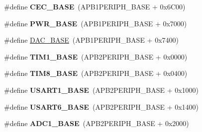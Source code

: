 \begin{DoxyCompactItemize}
\item 
\#define {\bfseries C\+E\+C\+\_\+\+B\+A\+SE}~(A\+P\+B1\+P\+E\+R\+I\+P\+H\+\_\+\+B\+A\+SE + 0x6\+C00)\hypertarget{group___peripheral__memory__map_gaacb77bc44b3f8c87ab98f241e760e440}{}\label{group___peripheral__memory__map_gaacb77bc44b3f8c87ab98f241e760e440}

\item 
\#define {\bfseries P\+W\+R\+\_\+\+B\+A\+SE}~(A\+P\+B1\+P\+E\+R\+I\+P\+H\+\_\+\+B\+A\+SE + 0x7000)\hypertarget{group___peripheral__memory__map_gac691ec23dace8b7a649a25acb110217a}{}\label{group___peripheral__memory__map_gac691ec23dace8b7a649a25acb110217a}

\item 
\#define \hyperlink{group___peripheral__memory__map_gad18d0b914c7f68cecbee1a2d23a67d38}{D\+A\+C\+\_\+\+B\+A\+SE}~(A\+P\+B1\+P\+E\+R\+I\+P\+H\+\_\+\+B\+A\+SE + 0x7400)
\item 
\#define {\bfseries T\+I\+M1\+\_\+\+B\+A\+SE}~(A\+P\+B2\+P\+E\+R\+I\+P\+H\+\_\+\+B\+A\+SE + 0x0000)\hypertarget{group___peripheral__memory__map_gaf8aa324ca5011b8173ab16585ed7324a}{}\label{group___peripheral__memory__map_gaf8aa324ca5011b8173ab16585ed7324a}

\item 
\#define {\bfseries T\+I\+M8\+\_\+\+B\+A\+SE}~(A\+P\+B2\+P\+E\+R\+I\+P\+H\+\_\+\+B\+A\+SE + 0x0400)\hypertarget{group___peripheral__memory__map_ga5b72f698b7a048a6f9fcfe2efe5bc1db}{}\label{group___peripheral__memory__map_ga5b72f698b7a048a6f9fcfe2efe5bc1db}

\item 
\#define {\bfseries U\+S\+A\+R\+T1\+\_\+\+B\+A\+SE}~(A\+P\+B2\+P\+E\+R\+I\+P\+H\+\_\+\+B\+A\+SE + 0x1000)\hypertarget{group___peripheral__memory__map_ga86162ab3f740db9026c1320d46938b4d}{}\label{group___peripheral__memory__map_ga86162ab3f740db9026c1320d46938b4d}

\item 
\#define {\bfseries U\+S\+A\+R\+T6\+\_\+\+B\+A\+SE}~(A\+P\+B2\+P\+E\+R\+I\+P\+H\+\_\+\+B\+A\+SE + 0x1400)\hypertarget{group___peripheral__memory__map_gade4d3907fd0387ee832f426f52d568bb}{}\label{group___peripheral__memory__map_gade4d3907fd0387ee832f426f52d568bb}

\item 
\#define {\bfseries A\+D\+C1\+\_\+\+B\+A\+SE}~(A\+P\+B2\+P\+E\+R\+I\+P\+H\+\_\+\+B\+A\+SE + 0x2000)\hypertarget{group___peripheral__memory__map_ga695c9a2f892363a1c942405c8d351b91}{}\label{group___peripheral__memory__map_ga695c9a2f892363a1c942405c8d351b91}


\end{DoxyCompactItemize}
